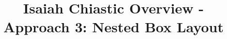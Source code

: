 \documentclass[11pt]{article}
\begin{document}
\title{Isaiah Chiastic Overview - Approach 3: Nested Box Layout}
\date{}
\maketitle


\vspace{2cm}

\end{document}

